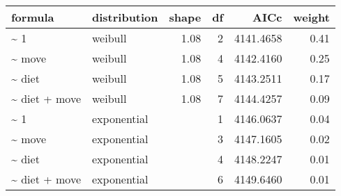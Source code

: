 \begin{table}[ht]
\centering
\begin{tabular}{llrrrr}
 formula & distribution & shape & df & AICc & weight \\ 
  \hline
\~{} 1 & weibull & 1.08 & 2 & 4141.4658 & 0.41 \\ 
  \~{} move & weibull & 1.08 & 4 & 4142.4160 & 0.25 \\ 
  \~{} diet & weibull & 1.08 & 5 & 4143.2511 & 0.17 \\ 
  \~{} diet + move & weibull & 1.08 & 7 & 4144.4257 & 0.09 \\ 
  \~{} 1 & exponential &  & 1 & 4146.0637 & 0.04 \\ 
  \~{} move & exponential &  & 3 & 4147.1605 & 0.02 \\ 
  \~{} diet & exponential &  & 4 & 4148.2247 & 0.01 \\ 
  \~{} diet + move & exponential &  & 6 & 4149.6460 & 0.01 \\ 
  \end{tabular}
\label{tab:nag}
\end{table}
